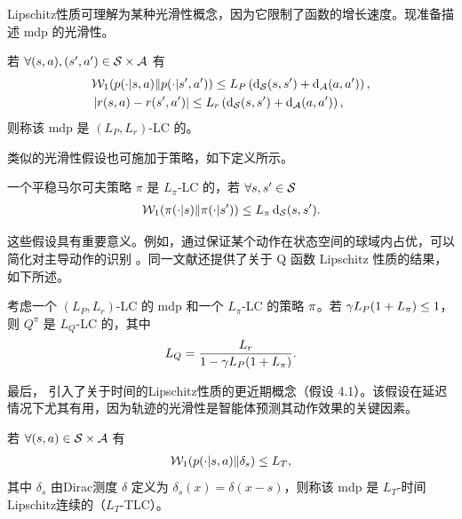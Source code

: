 Lipschitz性质可理解为某种光滑性概念，因为它限制了函数的增长速度。现准备描述 \gls{mdp} 的光滑性。

\begin{defi}
\label{def:lip_mdp}
    若 $\forall(s,a),(s',a')\in\statespace\times\actionspace$ 有
    \begin{align*}
        & \wassersteindistance[1](\transitionfunction(\cdot\vert s,a)\Vert \transitionfunction(\cdot\vert s',a'))\leq L_P \left( \distance_{\statespace}(s,s')  + \distance_{\actionspace}(a,a')\right),
        \\
        & \left\vert r(s,a)-r(s',a') \right\vert \leq L_r \left( \distance_{\statespace}(s,s') + \distance_{\actionspace}(a,a')\right),
    \end{align*}
    则称该 \gls{mdp} 是 $(L_P,L_r)$-LC 的。
\end{defi}

类似的光滑性假设也可施加于策略，如下定义所示。

\begin{defi}[Lipschitz策略]
\label{def:lip_policy}
    一个平稳马尔可夫策略 $\pi$ 是 $L_\pi$-LC 的，若 $\forall s,s'\in\statespace$
    \begin{align*}
        \wassersteindistance[1](\pi(\cdot\vert s)\Vert \pi(\cdot\vert s'))\leq L_\pi \distance_{\statespace}(s,s').
    \end{align*}
\end{defi}

这些假设具有重要意义。例如，通过保证某个动作在状态空间的球域内占优，可以简化对主导动作的识别 \cite{rachelson2010locality}。同一文献还提供了关于 Q 函数 Lipschitz 性质的结果，如下所述。

\begin{thm}
\label{th:lip_Q_function}
    考虑一个 $(L_P,L_r)$-LC 的 \gls{mdp} 和一个 $L_\pi$-LC 的策略 $\policy$。若 $\gamma L_P(1+L_\policy)\le 1$，则 $Q^\pi$ 是 $L_Q$-LC 的，其中
    \begin{align*}
        L_Q=\frac{L_r}{1-\gamma L_P(1+L_\policy)}.
    \end{align*}
\end{thm}

最后，\cite{metelli2020control} 引入了关于时间的Lipschitz性质的更近期概念（假设 4.1）。该假设在延迟情况下尤其有用，因为轨迹的光滑性是智能体预测其动作效果的关键因素。

\begin{defi}
\label{def:time_lip}
    若 $\forall (s,a)\in \statespace\times\actionspace$ 有
    \begin{align*}
        \wassersteindistance[1](\transitionfunction(\cdot\vert s,a)\Vert \delta_s)\le L_T,
    \end{align*}
    其中 $\delta_s$ 由Dirac测度 $\delta$ 定义为 $\delta_s(x)=\delta(x-s)$，则称该 \gls{mdp} 是 $L_T$-时间Lipschitz连续的（$L_T$-TLC）。
\end{defi}

